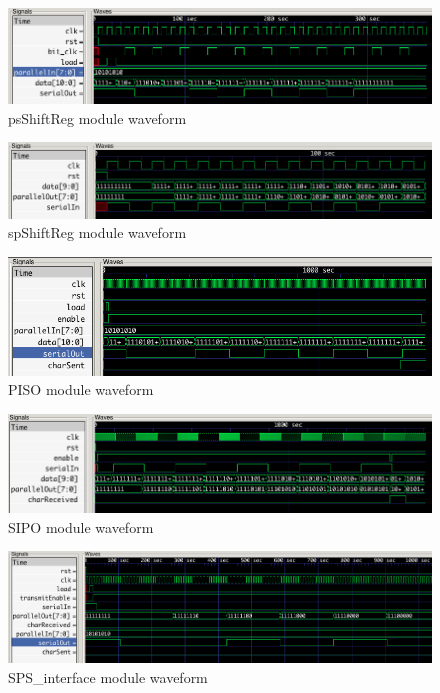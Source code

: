 \documentclass{article}
\begin{document}
      \begin{figure}[H]
        \centering
        \includegraphics[width=0.75\linewidth]{figures/gtkwave/psShiftReg_gtkwave.png}
        \caption{psShiftReg module waveform}
        \label{fig:psShiftReg_gtkwave}
      \end{figure}

      \begin{figure}[H]
        \centering
        \includegraphics[width=0.75\linewidth]{figures/gtkwave/spShiftReg_gtkwave.png}
        \caption{spShiftReg module waveform}
        \label{fig:spShiftReg_gtkwave}
      \end{figure}

      \begin{figure}[H]
        \centering
        \includegraphics[width=0.75\linewidth]{figures/gtkwave/PISO_gtkwave.png}
        \caption{PISO module waveform}
        \label{fig:PISO_gtkwave}
      \end{figure}

      \begin{figure}[H]
        \centering
        \includegraphics[width=0.75\linewidth]{figures/gtkwave/SIPO_gtkwave.png}
        \caption{SIPO module waveform}
        \label{fig:SIPO_gtkwave}
      \end{figure}

      \begin{figure}[H]
        \centering
        \includegraphics[width=0.75\linewidth]{figures/gtkwave/SPS_interface_gtkwave.png}
        \caption{SPS\_interface module waveform}
        \label{fig:SPS_interface_gtkwave}
      \end{figure}
\end{document}
